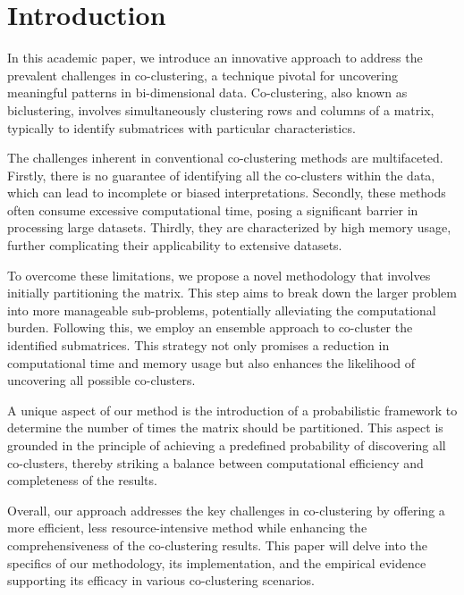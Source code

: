 
\section{Introduction}

In this academic paper, we introduce an innovative approach to address the prevalent challenges in co-clustering, a technique pivotal for uncovering meaningful patterns in bi-dimensional data. Co-clustering, also known as biclustering, involves simultaneously clustering rows and columns of a matrix, typically to identify submatrices with particular characteristics.

The challenges inherent in conventional co-clustering methods are multifaceted. Firstly, there is no guarantee of identifying all the co-clusters within the data, which can lead to incomplete or biased interpretations. Secondly, these methods often consume excessive computational time, posing a significant barrier in processing large datasets. Thirdly, they are characterized by high memory usage, further complicating their applicability to extensive datasets.

To overcome these limitations, we propose a novel methodology that involves initially partitioning the matrix. This step aims to break down the larger problem into more manageable sub-problems, potentially alleviating the computational burden. Following this, we employ an ensemble approach to co-cluster the identified submatrices. This strategy not only promises a reduction in computational time and memory usage but also enhances the likelihood of uncovering all possible co-clusters.

A unique aspect of our method is the introduction of a probabilistic framework to determine the number of times the matrix should be partitioned. This aspect is grounded in the principle of achieving a predefined probability of discovering all co-clusters, thereby striking a balance between computational efficiency and completeness of the results.

Overall, our approach addresses the key challenges in co-clustering by offering a more efficient, less resource-intensive method while enhancing the comprehensiveness of the co-clustering results. This paper will delve into the specifics of our methodology, its implementation, and the empirical evidence supporting its efficacy in various co-clustering scenarios.

